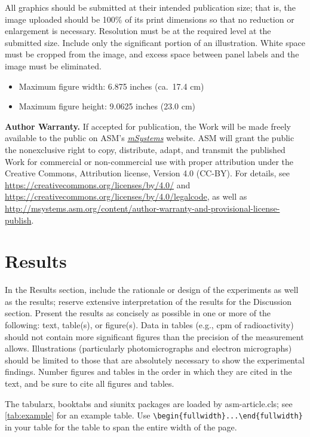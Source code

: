 \documentclass[lineno]{asm-article}
\begin{document}
All graphics should be submitted at their intended publication size; that is, the image uploaded should be 100\% of its print dimensions so that no reduction or enlargement is necessary. Resolution must be at the required level at the submitted size. Include only the significant portion of an illustration. White space must be cropped from the image, and excess space between panel labels and the image must be eliminated.

\begin{itemize}
\item Maximum figure width: 6.875 inches (ca.~17.4 cm)
\item Maximum figure height: 9.0625 inches (23.0 cm)
\end{itemize}

\textbf{Author Warranty.} If accepted for publication, the Work will be made freely available to the public on ASM's \textit{\href{http://msystems.asm.org}{mSystems}} website. ASM will grant the public the nonexclusive right to copy, distribute, adapt, and transmit the published Work for commercial or non-commercial use with proper attribution under the Creative Commons, Attribution license, Version 4.0 (CC-BY). For details, see \url{https://creativecommons.org/licenses/by/4.0/} and \url{https://creativecommons.org/licenses/by/4.0/legalcode}, as well as \url{http://msystems.asm.org/content/author-warranty-and-provisional-license-publish}.

\section{Results}

In the Results section, include the rationale or design of the experiments as well as the results; reserve extensive interpretation  of  the  results  for  the  Discussion  section.  Present the results as concisely as possible in one or more of the following: text, table(s), or figure(s). Data in tables (e.g., cpm of radioactivity) should not contain more significant figures than the precision of the measurement allows. Illustrations (particularly photomicrographs and electron micrographs) should be limited to those that are absolutely necessary to show the experimental findings. Number figures and tables in the order in which they are cited in the text, and be sure to cite all figures and tables.

The tabularx, booktabs and siunitx packages are loaded by asm-article.cls; see \autoref{tab:example} for an example table. Use \verb|\begin{fullwidth}...\end{fullwidth}| in your table for the table to span the entire width of the page.
\end{document}
